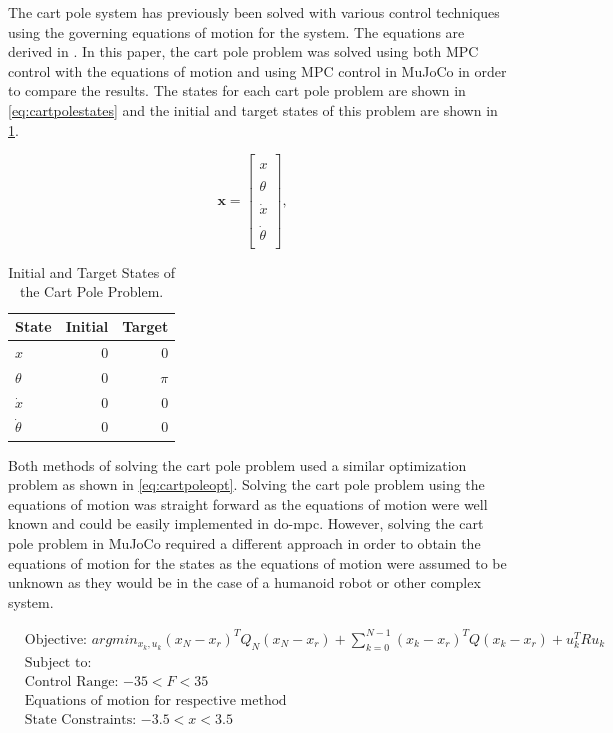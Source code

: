 \documentclass{./springer/svjour3}
\newcommand{\mb}[1]{\mathbf{#1}}
\begin{document}
The cart pole system has previously been solved with various control techniques using the governing equations of motion for the system. The equations are derived in \cite{key}. In this
paper, the cart pole problem was solved using both MPC control with the equations of motion and using MPC control in MuJoCo in order to compare the results.
The states for each cart pole problem are shown in \ref{eq:cartpolestates} and the initial and target states of this problem are shown in
\ref{tab:init_tar_carteqn}.

\begin{equation}
  \mb{x} = 
  \begin{bmatrix}
  \\x\\
  \\\theta\\
  \\\dot{x}\\
  \\\dot{\theta}\\
  \end{bmatrix}, \quad
  \label{eq:cartpolestates}
\end{equation}

\begin{table}[h]
  \centering
  \caption{Initial and Target States of the Cart Pole Problem.}
  \begin{tabular}{lrr}
  \toprule
  State & Initial & Target\\
  \midrule
  $x$ & 0  & 0\\
  $\theta$ & 0 & $\pi$ \\
  $\dot{x}$ & 0 & 0\\
  $\dot{\theta}$ & 0 & 0\\
  \end{tabular}
  \label{tab:init_tar_carteqn}
\end{table}

Both methods of solving the cart pole problem used a similar optimization problem as shown in \ref{eq:cartpoleopt}. 
Solving the cart pole problem using the equations of motion was straight forward as the equations of motion were well known and could be easily implemented in do-mpc.
However, solving the cart pole problem in MuJoCo required a different approach in order to obtain the equations of motion for the states as the equations of motion 
were assumed to be unknown as they would be in the case of a humanoid robot or other complex system.

\begin{equation}
  \begin{aligned}
  &\text{Objective: $arg min_{x_k,u_k} (x_N - x_r)^TQ_N(x_N - x_r) + \sum_{k = 0}^{N-1} (x_k - x_r)^TQ(x_k - x_r) + u_k^TRu_k $}\\
  &\text{Subject to:}\\
  &\text{Control Range: $-35 < F < 35$}\\
  &\text{Equations of motion for respective method}\\
  &\text{State Constraints: $-3.5 < x < 3.5$}
  \end{aligned}
  \label{eq:cartpoleopt}
\end{equation}
\end{document}
